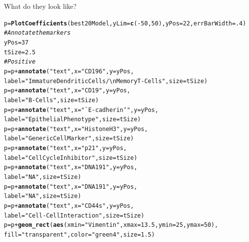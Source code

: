 \documentclass[a4paper]{article}\usepackage[]{graphicx}\usepackage[]{color}
\makeatletter
\newcommand{\hlnum}[1]{\textcolor[rgb]{0.686,0.059,0.569}{#1}}%
\newcommand{\hlstr}[1]{\textcolor[rgb]{0.192,0.494,0.8}{#1}}%
\newcommand{\hlcom}[1]{\textcolor[rgb]{0.678,0.584,0.686}{\textit{#1}}}%
\newcommand{\hlopt}[1]{\textcolor[rgb]{0,0,0}{#1}}%
\newcommand{\hlstd}[1]{\textcolor[rgb]{0.345,0.345,0.345}{#1}}%
\newcommand{\hlkwb}[1]{\textcolor[rgb]{0.69,0.353,0.396}{#1}}%
\newcommand{\hlkwc}[1]{\textcolor[rgb]{0.333,0.667,0.333}{#1}}%
\newcommand{\hlkwd}[1]{\textcolor[rgb]{0.737,0.353,0.396}{\textbf{#1}}}%
\newenvironment{kframe}{%
 \def\at@end@of@kframe{}%
 \ifinner\ifhmode%
  \def\at@end@of@kframe{\end{minipage}}%
  \begin{minipage}{\columnwidth}%
 \fi\fi%
 \def\FrameCommand##1{\hskip\@totalleftmargin \hskip-\fboxsep
 \colorbox{shadecolor}{##1}\hskip-\fboxsep
     \hskip-\linewidth \hskip-\@totalleftmargin \hskip\columnwidth}%
 \MakeFramed {\advance\hsize-\width
   \@totalleftmargin\z@ \linewidth\hsize
   \@setminipage}}%
 {\par\unskip\endMakeFramed%
 \at@end@of@kframe}
\newenvironment{knitrout}{}{} %
\makeatother
\begin{document}
What do they look like?
\begin{knitrout}
\color{fgcolor}\begin{kframe}
\begin{alltt}
\hlstd{p} \hlkwb{=} \hlkwd{PlotCoefficients}\hlstd{(best20Model,}\hlkwc{yLim}\hlstd{=}\hlkwd{c}\hlstd{(}\hlopt{-}\hlnum{50}\hlstd{,}\hlnum{50}\hlstd{),}\hlkwc{yPos}\hlstd{=}\hlnum{22}\hlstd{,}\hlkwc{errBarWidth}\hlstd{=}\hlnum{.4}\hlstd{)}
\hlcom{# Annotate the markers}
\hlstd{yPos} \hlkwb{=} \hlnum{37}
\hlstd{tSize} \hlkwb{=} \hlnum{2.5}
\hlcom{# Positive}
\hlstd{p} \hlkwb{=} \hlstd{p} \hlopt{+} \hlkwd{annotate}\hlstd{(}\hlstr{"text"}\hlstd{,} \hlkwc{x} \hlstd{=} \hlstr{"CD196"}\hlstd{,} \hlkwc{y} \hlstd{= yPos,}
                       \hlkwc{label} \hlstd{=} \hlstr{"Immature Dendritic Cells/\textbackslash{}n Memory T-Cells"}\hlstd{,} \hlkwc{size} \hlstd{= tSize)}
\hlstd{p} \hlkwb{=} \hlstd{p} \hlopt{+} \hlkwd{annotate}\hlstd{(}\hlstr{"text"}\hlstd{,} \hlkwc{x} \hlstd{=} \hlstr{"CD19"}\hlstd{,} \hlkwc{y} \hlstd{= yPos,}
                       \hlkwc{label} \hlstd{=} \hlstr{"B-Cells"}\hlstd{,} \hlkwc{size} \hlstd{= tSize)}
\hlstd{p} \hlkwb{=} \hlstd{p} \hlopt{+} \hlkwd{annotate}\hlstd{(}\hlstr{"text"}\hlstd{,} \hlkwc{x} \hlstd{=} \hlstr{"`E-cadherin`"}\hlstd{,} \hlkwc{y} \hlstd{= yPos,}
                       \hlkwc{label} \hlstd{=} \hlstr{"Epithelial Phenotype"}\hlstd{,} \hlkwc{size} \hlstd{= tSize)}
\hlstd{p} \hlkwb{=} \hlstd{p} \hlopt{+} \hlkwd{annotate}\hlstd{(}\hlstr{"text"}\hlstd{,} \hlkwc{x} \hlstd{=} \hlstr{"HistoneH3"}\hlstd{,} \hlkwc{y} \hlstd{= yPos,}
                       \hlkwc{label} \hlstd{=} \hlstr{"Generic Cell Marker"}\hlstd{,} \hlkwc{size} \hlstd{= tSize)}
\hlstd{p} \hlkwb{=} \hlstd{p} \hlopt{+} \hlkwd{annotate}\hlstd{(}\hlstr{"text"}\hlstd{,} \hlkwc{x} \hlstd{=} \hlstr{"p21"}\hlstd{,} \hlkwc{y} \hlstd{= yPos,}
                       \hlkwc{label} \hlstd{=} \hlstr{"Cell Cycle Inhibitor"}\hlstd{,} \hlkwc{size} \hlstd{= tSize)}
\hlstd{p} \hlkwb{=} \hlstd{p} \hlopt{+} \hlkwd{annotate}\hlstd{(}\hlstr{"text"}\hlstd{,} \hlkwc{x} \hlstd{=} \hlstr{"DNA191"}\hlstd{,} \hlkwc{y} \hlstd{= yPos,}
                       \hlkwc{label} \hlstd{=} \hlstr{"NA"}\hlstd{,} \hlkwc{size} \hlstd{= tSize)}
\hlstd{p} \hlkwb{=} \hlstd{p} \hlopt{+} \hlkwd{annotate}\hlstd{(}\hlstr{"text"}\hlstd{,} \hlkwc{x} \hlstd{=} \hlstr{"DNA191"}\hlstd{,} \hlkwc{y} \hlstd{= yPos,}
                       \hlkwc{label} \hlstd{=} \hlstr{"NA"}\hlstd{,} \hlkwc{size} \hlstd{= tSize)}
\hlstd{p} \hlkwb{=} \hlstd{p} \hlopt{+} \hlkwd{annotate}\hlstd{(}\hlstr{"text"}\hlstd{,} \hlkwc{x} \hlstd{=} \hlstr{"CD44s"}\hlstd{,} \hlkwc{y} \hlstd{= yPos,}
                       \hlkwc{label} \hlstd{=} \hlstr{"Cell-Cell Interaction"}\hlstd{,} \hlkwc{size} \hlstd{= tSize)}
\hlstd{p} \hlkwb{=} \hlstd{p} \hlopt{+} \hlkwd{geom_rect}\hlstd{(}\hlkwd{aes}\hlstd{(}\hlkwc{xmin} \hlstd{=} \hlstr{"Vimentin"}\hlstd{,} \hlkwc{xmax} \hlstd{=} \hlnum{13.5}\hlstd{,} \hlkwc{ymin} \hlstd{=} \hlnum{25}\hlstd{,} \hlkwc{ymax} \hlstd{=} \hlnum{50}\hlstd{),}
               \hlkwc{fill} \hlstd{=} \hlstr{"transparent"}\hlstd{,} \hlkwc{color} \hlstd{=} \hlstr{"green4"}\hlstd{,} \hlkwc{size} \hlstd{=} \hlnum{1.5}\hlstd{)}


\end{alltt}
\end{kframe}
\end{knitrout}
\end{document}
